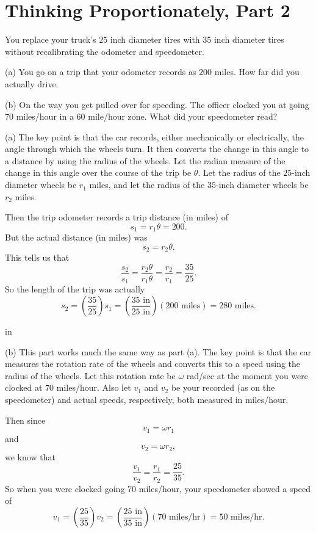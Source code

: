 \documentclass{ximera}
\newcommand{\pskip}{\vskip 0.1 in}
\begin{document}
\section{Thinking Proportionately, Part 2}

\begin{question}  \label{Q6521:Angles}
You replace  your truck's $25$ inch diameter tires with $35$ inch diameter tires without recalibrating the odometer and speedometer.

(a) You go on a trip that your odometer records as $200$ miles. How far did you actually drive.

(b) On the way you get pulled over for speeding. The officer clocked you at going $70$ miles/hour in a $60$ mile/hour zone. What did your speedometer read?

\begin{hint}
(a) The key point is that the car records, either mechanically or electrically, the angle through which the wheels turn. It then converts the change in this angle to a distance by using the radius of the wheels. Let the radian measure of the change in this angle over the course of the trip be $\theta$. Let the radius of the $25$-inch diameter wheels be $r_1$ miles, and let the radius of the $35$-inch diameter wheels be $r_2$ miles. 

Then the trip odometer records a trip distance (in miles) of 
\[
   s_1 = r_1\theta =200.
\]
But the actual distance (in miles) was
\[
  s_2 = r_2\theta .
\]
This tells us that
\[
    \frac{s_2}{s_1} = \frac{r_2\theta}{r_1 \theta} = \frac{r_2}{r_1} = \frac{35}{25}.
\]
So the length of the trip was actually
\[
   s_2 = \left( \frac{35}{25}\right) s_1 = \left(\frac{35\text{ in}}{25\text{ in}} \right) (200 \text{ miles}) = 280 \text{ miles}.
\]

\pskip

(b) This part works much the same way as part (a). The key point is that the car measures the rotation rate of the wheels and converts this to a speed using the radius of the wheels. Let this rotation rate be $\omega$ rad/sec at the moment you were clocked at $70$ miles/hour. Also let $v_1$ and $v_2$ be  your recorded (as on the speedometer) and actual speeds, respectively, both measured in miles/hour.

Then since
\[
  v_1 = \omega r_1
\]
and 
\[
  v_2 = \omega r_2 ,
\]
we know that
\[
    \frac{v_1}{v_2} =  \frac{r_1}{r_2} = \frac{25}{35}. 
\]
So when you were clocked going $70$ miles/hour, your speedometer showed a speed of
\[
   v_1 = \left( \frac{25}{35}\right) v_2 = \left(\frac{25\text{ in}}{35\text{ in}} \right) (70 \text{ miles/hr}) = 50 \text{ miles/hr}.
\]

\end{hint}

\end{question}
\end{document}
